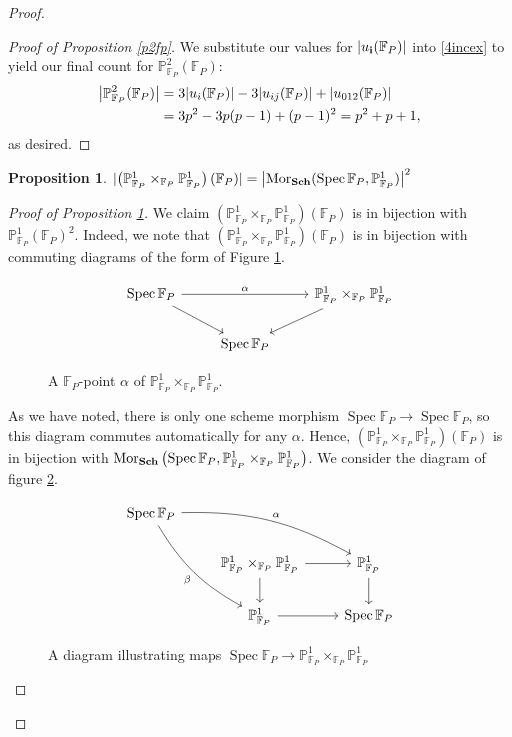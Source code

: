 \documentclass[english,letter,doublesided]{article}
\let\avec=\vec
\renewcommand\vec{\mathbf}
\DeclareMathOperator{\Spec}{Spec}
\DeclareMathOperator{\spec}{Spec}
\newcommand{\mor}{\mathrm{Mor}}
\DeclarePairedDelimiter\abs{\lvert}{\rvert}%
\newcommand{\FF}{\mathbb{F}}
\newcommand{\PP}{\mathbb{P}}
\newenvironment{subproof}[1][\proofname]{%
	\renewcommand{\qedsymbol}{$\blacksquare$}%
	\begin{proof}[#1]%
	}{%
	\end{proof}%
}
\newtheorem{prop}[thm]{Proposition}
\theoremstyle{remark}
\theoremstyle{definition}
\newcommand{\cat}[1]{{\mathrm{\bf{#1}}}}
\newcommand{\Fp}{{\FF_P}}
\begin{document}
\begin{proof}
\begin{subproof}[Proof of Proposition \ref{p2fp}]
We substitute our values for $\abs{u_{\avec{i}}(\Fp)}$ into \eqref{4incex} to yield our final count for $\PP^2_\Fp(\Fp)$: \begin{align*}
	\abs*{\PP^2_\Fp(\Fp)}&=3\abs*{ u_i(\Fp)}-3\abs*{u_{ij}(\Fp)}+\abs*{u_{012}(\Fp)}\\
	&=3p^2-3p(p-1)+(p-1)^2=p^2+p+1, \end{align*} as desired.
\end{subproof}
\begin{prop}
	$\abs{\left(\PP^1_\Fp\times_\Fp\PP^1_\Fp\right)(\Fp)}=\abs*{\mor_{\cat{Sch}}(\spec\Fp,\PP^1_\Fp)}^2$\label{4prop2}
\end{prop}\begin{subproof}[Proof of Proposition \ref{4prop2}]
We claim $\left(\PP^1_\Fp\times_\Fp\PP^1_\Fp\right)(\Fp)$ is in bijection with $\PP^1_\Fp(\Fp)^2$. Indeed, we note that $\left(\PP^1_\Fp\times_\Fp\PP^1_\Fp\right)(\Fp)$ is in bijection with commuting diagrams of the form of Figure \ref{4prodpts}.
\begin{figure}[h!]

	$$\begin{tikzcd}
\spec \Fp \arrow[dr]\arrow[rr,"\alpha"]&&\PP^1_\Fp\times_\Fp\PP^1_\Fp\arrow[dl]\\&\spec \Fp &
	\end{tikzcd}$$\caption{A $\Fp$-point $\alpha$ of $\PP^1_\Fp\times_\Fp\PP^1_\Fp$.\label{4prodpts}}

\end{figure}
As we have noted, there is only one scheme morphism $\spec\Fp\to\Spec\Fp$, so this diagram commutes automatically for any $\alpha$. Hence, $\left(\PP^1_\Fp\times_\Fp\PP^1_\Fp\right)(\Fp)$ is in bijection with $\mor_\cat{Sch}\left(\spec \Fp,\PP^1_\Fp\times_\Fp\PP^1_\Fp\right)$. We consider the diagram of figure \ref{4proun}.
\begin{figure}[h!]
	\begin{centering}
		$$\begin{tikzcd}
		\spec \Fp\arrow[drr,"\alpha",bend left=15]\arrow[rdd,"\beta",bend right=15,swap]&&\\
		&\PP^1_\Fp\times_\Fp\PP^1_\Fp\arrow[d]\arrow[r]&\PP^1_\Fp\arrow[d]\\
		&\PP^1_\Fp\arrow[r]&\spec \Fp
		\end{tikzcd}$$\caption{A diagram illustrating maps $\spec \Fp\to\PP^1_\Fp\times_\Fp\PP^1_\Fp$ \label{4proun}}
	\end{centering}
\end{figure}


\end{subproof}
\end{proof}
\end{document}
